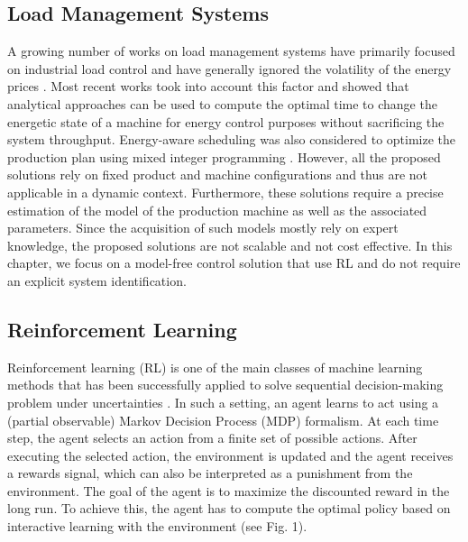 \subsection{Load Management Systems}

A growing number of works on load management systems have primarily focused on industrial load control and have generally ignored the volatility of the energy prices \cite{Gholian7236921, CHEN2015263, Wang6345296, MIDDELBERG20091266}. Most recent works \cite{Sun6329376, DUFLOU2012587, Bakakeu8607483, Pechmann2011} took into account this factor and showed that analytical approaches can be used to compute the optimal time to change the energetic state of a machine for energy control purposes without sacrificing the system throughput. Energy-aware scheduling was also considered to optimize the production plan using mixed integer programming \cite{BRUZZONE2012459, FANG2011234}. However, all the proposed solutions rely on fixed product and machine configurations and thus are not applicable in a dynamic context. Furthermore, these solutions require a precise estimation of the model of the production machine as well as the associated parameters. Since the acquisition of such models mostly rely on expert knowledge, the proposed solutions are not scalable and not cost effective. In this chapter, we focus on a model-free control solution that use RL and do not require an explicit system identification.

\subsection{Reinforcement Learning}
Reinforcement learning (RL) is one of the main classes of machine learning methods that has been successfully applied to solve sequential decision-making problem under uncertainties \cite{Liu6918520}. In such a setting, an agent learns to act using a (partial observable) Markov Decision Process (MDP) \cite{Sutton9780262039246} formalism. At each time step, the agent selects an action from a finite set of possible actions. After executing the selected action, the environment is updated and the agent receives a rewards signal, which can also be interpreted as a punishment from the environment. The goal of the agent is to maximize the discounted reward in the long run. To achieve this, the agent has to compute the optimal policy based on interactive learning with the environment (see Fig. 1).

